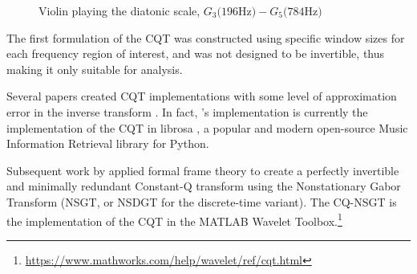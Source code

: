 \documentclass[letter,12pt,notitlepage]{article}
\begin{document}
\begin{figure}[ht]
	\centering
	\hspace{0.5em}
	\caption{Violin playing the diatonic scale, $G_{3} \text{(196Hz)} - G_{5} \text{(784Hz)}$}
	\label{fig:violin}
\end{figure}



The first formulation of the CQT was constructed using specific window sizes for each frequency region of interest, and was not designed to be invertible, thus making it only suitable for analysis.

Several papers created CQT implementations with some level of approximation error in the inverse transform \cite{klapuricqt, fitzgeraldcqt}. In fact, \citet{klapuricqt}'s implementation is currently the implementation of the CQT in librosa \cite{librosa}, a popular and modern open-source Music Information Retrieval library for Python.

Subsequent work by \citet{balazs, jaillet, invertiblecqt} applied formal frame theory to create a perfectly invertible and minimally redundant Constant-Q transform using the Nonstationary Gabor Transform (NSGT, or NSDGT for the discrete-time variant). The CQ-NSGT is the implementation of the CQT in the MATLAB Wavelet Toolbox.\footnote{\href{https://www.mathworks.com/help/wavelet/ref/cqt.html}{https://www.mathworks.com/help/wavelet/ref/cqt.html}} 
\end{document}
